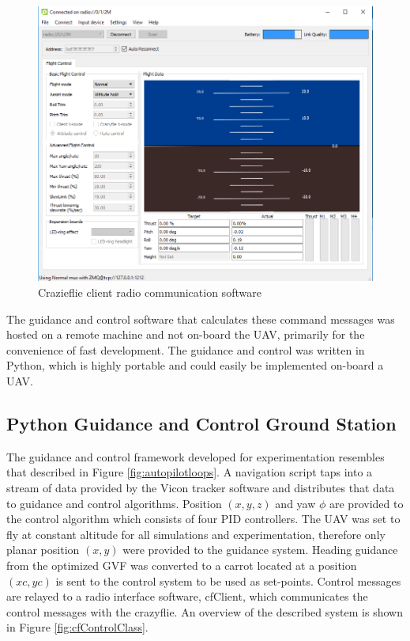 \documentclass[numbered,pdftex]{ohio-etd}
\begin{document}
\begin{figure}[H]
	\centering
	\includegraphics[trim=0 0 0 0,clip,width=12cm]{PaperFigures/Methods/cfClient}
	\caption{Crazieflie client radio communication software}
	\label{fig:cfClient}
\end{figure}

The guidance and control software that calculates these command messages was hosted on a remote machine and not on-board the UAV, primarily for the convenience of fast development. The guidance and control was written in Python, which is highly portable and could easily be implemented on-board a UAV. 




\subsection{Python Guidance and Control Ground Station}

The guidance and control framework developed for experimentation resembles that described in Figure \ref{fig:autopilotloops}. A navigation script taps into a stream of data provided by the Vicon tracker software and distributes that data to guidance and control algorithms. Position $(x,y,z)$ and yaw $\phi$ are provided to the control algorithm which consists of four PID controllers. The UAV was set to fly at constant altitude for all simulations and experimentation, therefore only planar position $(x,y)$ were provided to the guidance system. Heading guidance from the optimized GVF was converted to a carrot located at a position $(xc,yc)$ is sent to the control system to be used as set-points. Control messages are relayed to a radio interface software, cfClient, which communicates the control messages with the crazyflie. An overview of the described system is shown in Figure \ref{fig:cfControlClass}.
\end{document}

